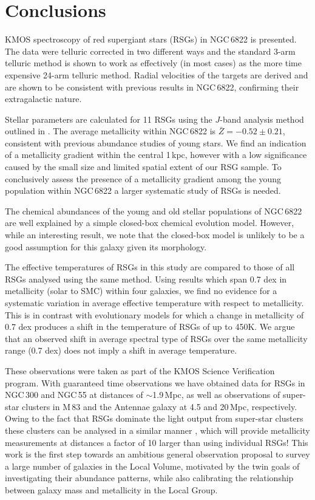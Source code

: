 \documentclass[iop]{emulateapj}
\begin{document}

\section{Conclusions} %
\label{sec:conclusions}

KMOS spectroscopy of red supergiant stars (RSGs) in NGC\,6822 is presented.
The data were telluric corrected in two different ways and the standard 3-arm telluric method is shown to work as effectively (in most cases) as the more time expensive 24-arm telluric method.
Radial velocities of the targets are derived and are shown to be consistent with previous results in NGC\,6822, confirming their extragalactic nature.

Stellar parameters are calculated for 11 RSGs using the $J$-band analysis method outlined in
\cite{2010MNRAS.407.1203D}.
The average metallicity within NGC\,6822 is
$\bar{Z} = -0.52\pm 0.21$,
consistent with previous abundance studies of young stars.
We find an indication of a metallicity gradient within the central 1\,kpc,
however with a low significance caused by the small size and limited spatial extent of our RSG sample.
To conclusively assess the presence of a metallicity gradient among the young population within NGC\,6822 a larger systematic study of RSGs is needed.

The chemical abundances of the young and old stellar populations of NGC\,6822 are well explained by a simple closed-box chemical evolution model.
However, while an interesting result, we note that the closed-box model is unlikely to be a good assumption for this galaxy given its morphology.

The effective temperatures of RSGs in this study are compared to those of all RSGs analysed using the same method.
Using results which span 0.7 dex in metallicity (solar to SMC) within four galaxies, we find no evidence for a systematic variation in average effective temperature with respect to metallicity.
This is in contrast with evolutionary models for which a change in metallicity of 0.7 dex produces a shift in the temperature of RSGs of up to 450K.
We argue that an observed shift in average spectral type of RSGs over the same metallicity range (0.7 dex) does not imply a shift in average temperature.

These observations were taken as part of the KMOS Science Verification program.
With guaranteed time observations we have obtained data for RSGs in NGC\,300 and NGC\,55 at distances of $\sim$1.9\,Mpc,
as well as observations of super-star clusters in M\,83 and the Antennae galaxy at 4.5 and 20\,Mpc, respectively.
Owing to the fact that RSGs dominate the light output from super-star clusters
\citep{2013MNRAS.430L..35G} these clusters can be analysed in a similar manner
\citep{2014ApJ...787..142G},
which will provide metallicity measurements at distances a factor of 10 larger than using individual RSGs!
This work is the first step towards an ambitious general observation proposal to survey a large number of galaxies in the Local Volume,
motivated by the twin goals of investigating their abundance patterns,
while also calibrating the relationship between galaxy mass and metallicity in the Local Group.
\end{document}
